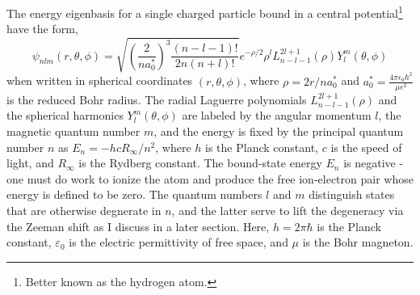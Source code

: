 	
	The energy eigenbasis for a single charged particle bound in a central potential\footnote{Better known as the hydrogen atom.} have the form,
	\begin{equation}
	\psi_{nlm}(r,\theta,\phi) = 
	\sqrt{\left(\frac{2}{na_0 ^*}\right)^3\frac{(n-l-1)!}{2n(n+l)!}}e^{-\rho/2}\rho^l L_{n-l-1}^{2l+1}(\rho) Y^{m}_{l}(\theta,\phi)
	\end{equation}
	when written in spherical coordinates $(r,\theta,\phi)$, where $\rho = 2r/na_0 ^*$ and $a_0 ^* = \frac{4\pi\epsilon_0 \hbar^2}{\mu e^2}$ is the reduced Bohr radius.
	The radial Laguerre polynomials $L_{n-l-1}^{2l+1}(\rho)$ and the spherical harmonics $Y_{l}^{m}(\theta,\phi)$ are labeled by the angular momentum $l$, the magnetic quantum number $m$, and the energy is fixed by the principal quantum number $n$ as $E_n = -hcR_\infty/n^2$, where $h$ is the Planck constant, $c$ is the speed of light, and $R_\infty$ is the Rydberg constant.
	The bound-state energy $E_n$ is negative - one must do work to ionize the atom and produce the free ion-electron pair whose energy is defined to be zero.
	The quantum numbers $l$ and $m$ distinguish states that are otherwise degnerate in $n$, and the latter serve to lift the degeneracy via the Zeeman shift as I discuss in a later section.
	Here,  $h=2\pi\hbar$ is the Planck constant, $\varepsilon_0$ is the electric permittivity of free space, and $\mu$ is the Bohr magneton.
	
	

